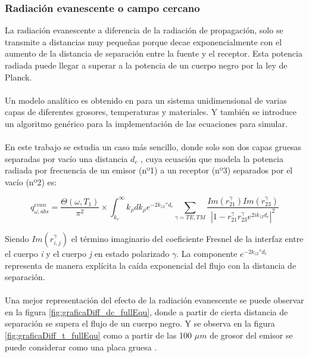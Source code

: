 \subsubsection{Radiación evanescente o campo cercano}
La radiación evanescente a diferencia de la radiación de propagación, solo se transmite a distancias muy pequeñas porque decae exponencialmente con el aumento de la distancia de separación entre la fuente y el receptor. Esta potencia radiada puede llegar a superar a la potencia de un cuerpo negro por la ley de Planck.\\\\
Un modelo analítico es obtenido en \cite{nfTPV_fullEquations} para un sistema unidimensional de varias capas de diferentes grosores, temperaturas y materiales. Y también se introduce un algoritmo genérico para la implementación de las ecuaciones para simular.\\\\
En este trabajo se estudia un caso más sencillo, donde solo son dos capas gruesas separadas por vacío una distancia $d_c$ \cite{nfTPV_equations}, cuya ecuación que modela la potencia radiada por frecuencia de un emisor (nº1) a un receptor (nº3) separados por el vacío (nº2) es:

\begin{equation}
q_{\omega,abs}^{evan}=\dfrac{\Theta \left( \omega,T_1 \right)}{\pi^2}\times \int^{\infty}_{k_\upsilon}k_\rho d k_\rho e^{-2k_{z2}'' d_c} \sum_{\gamma=TE,TM} \dfrac{Im\left( r_{21}^\gamma \right)Im\left( r_{23}^\gamma \right)}{\left| 1- r_{21}^\gamma r_{23}^\gamma e^{2ik_{z2}d_{c}} \right|^2}
\label{eq:flujoEvasNF}
\end{equation}

Siendo $Im\left(r_{i,j}^\gamma \right)$ el término imaginario del coeficiente Fresnel de la interfaz entre el cuerpo \textit{i} y el cuerpo \textit{j} en estado polarizado $\gamma$. La componente $e^{-2k_{z2}'' d_c}$ representa de manera explícita la caída exponencial del flujo con la distancia de separación.\\\\
Una mejor representación del efecto de la radiación evanescente se puede observar en la figura \ref{fig:graficaDiff_dc_fullEqu}, donde a partir de cierta distancia de separación se supera el flujo de un cuerpo negro. Y se observa en la figura \ref{fig:graficaDiff_t_fullEqu} como a partir de las 100 $\mu m$ de grosor del emisor se puede considerar como una placa gruesa \cite{nfTPV_fullEquations}.


